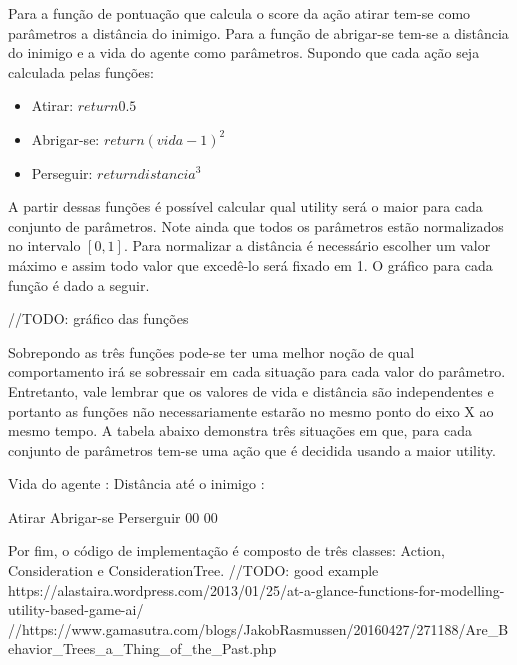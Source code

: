 \documentclass[12pt, 
openright, 
oneside, 
a4paper,    
brazil]{facom-ufu-abntex2}
\begin{document}
Para a função de pontuação que calcula o score da ação atirar tem-se como parâmetros a distância do inimigo. Para a função de abrigar-se tem-se a distância do inimigo e a vida do agente como parâmetros. Supondo que cada ação seja calculada pelas funções:

\begin{itemize}
    \item Atirar: $return 0.5$
    \item Abrigar-se: $return (vida - 1)^2$
    \item Perseguir: $return distancia^3$
\end{itemize}

 A partir dessas funções é possível calcular qual utility será o maior para cada conjunto de parâmetros. Note ainda que todos os parâmetros estão normalizados no intervalo $[0,1]$. Para normalizar a distância é necessário escolher um valor máximo e assim todo valor que excedê-lo será fixado em 1. O gráfico para cada função é dado a seguir.
 
 //TODO: gráfico das funções
 
 Sobrepondo as três funções pode-se ter uma melhor noção de qual comportamento irá se sobressair em cada situação para cada valor do parâmetro. Entretanto, vale lembrar que os valores de vida e distância são independentes e portanto as funções não necessariamente estarão no mesmo ponto do eixo X ao mesmo tempo.
 A tabela abaixo demonstra três situações em que, para cada conjunto de parâmetros tem-se uma ação que é decidida usando a maior utility.
 
 Vida do agente				:
 Distância até o inimigo	:
 
 Atirar		Abrigar-se		Perserguir
 00			00

Por fim, o código de implementação é composto de três classes: Action, Consideration e ConsiderationTree.
//TODO: good example https://alastaira.wordpress.com/2013/01/25/at-a-glance-functions-for-modelling-utility-based-game-ai/
//https://www.gamasutra.com/blogs/JakobRasmussen/20160427/271188/Are_Behavior_Trees_a_Thing_of_the_Past.php

\end{document}

